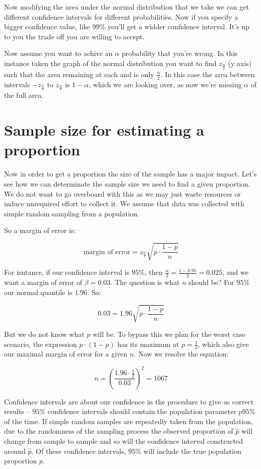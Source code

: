 Now modifying the area under the normal distribution that we take we can get
different confidence intervals for different probabilities. Now if you specify a
bigger confidence value, like $99\%$ you'll get a widder confidence interval.
It's up to you the trade off you are willing to accept.

Now assume you want to achive an $\alpha$ probability that you're wrong. In
this instance taken the graph of the normal distribution you want to find
$z_{\frac{\alpha}{2}}$ (y axis) such that the area remaining at each and is only
$\frac{\alpha}{2}$. In this case the area between intervals
$-z_{\frac{\alpha}{2}}$ to $z_{\frac{\alpha}{2}}$ is $1-\alpha$, which we are
looking over, as now we're missing $\alpha$ of the full area.

\section{Sample size for estimating a proportion}

Now in order to get a proportion the size of the sample has a major impact.
Let's see how we can determinate the sample size we need to find a given
proportion. We do not want to go overboard with this as we may just waste
resources or induce unrequired effort to collect it. We assume that data was
collected with simple random sampling from a population.

So a margin of error is: 

\[ \mbox{margin of error} = z_{\frac{\alpha}{2}}\sqrt{p \cdot
\frac{1-p}{n}}\]

For isntance, if our confidence interval is $95\%$, then 
$\frac{\alpha}{2}=\frac{1-0.95}{2}=0.025$, and we want a margin of error of
$\beta=0.03$. The question is what $n$ should be? For $95\%$ our normal quantile
is $1.96$. So:

\[ 0.03 = 1.96\sqrt{p \cdot
\frac{1-p}{n}}\]
 
 But we do not know what $p$ will be. To bypass this we plan for the worst case
 scenario, the expression $p\cdot(1-p)$ has its maximum at $p=\frac{1}{2}$,
 which also give our maximal margin of error for a given $n$. Now we resolve the
 equation:
 
 \[ n=\left( \frac{1.96 \cdot \frac{1}{2}}{0.03} \right)^2 = 1067 \]

Confidence intervals are about our confidence in the procedure to give us
correct results -- $95\%$ confidence intervals should contain the population
parameter $p 95\%$ of the time. If simple random samples are repeatedly taken
from the population, due to the randomness of the sampling process the observed
proportion of $\hat{p}$ will change from sample to sample and so will the
confidence interval constructed around $\hat{p}$. Of these confidence intervals,
$95\%$ will include the true population proportion $p$.

